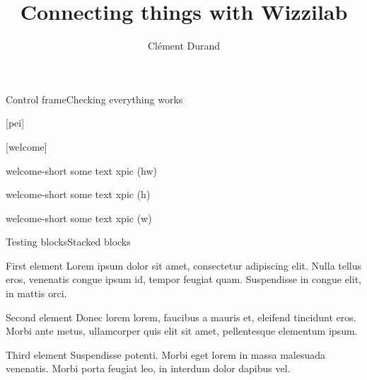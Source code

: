 \documentclass[aspectratio=169]{beamer}
\title[Stage de seconde année à l'École polytechnique]
      {Connecting things with Wizzilab}
\author{Clément Durand}
\begin{document}
\maketitle



\begin{frame}{Control frame}{Checking everything works}
  \lipsum[1]
\end{frame}

[pei]

[welcome]

\begin{xpic}{welcome-short}
  some text xpic (hw)
\end{xpic}



\begin{xpic}[h]{welcome-short}
  some text xpic (h)
\end{xpic}



\begin{xpic}[w]{welcome-short}
  some text xpic (w)
\end{xpic}



\begin{frame}{Testing blocks}{Stacked blocks}
  \begin{block}{First element}
    Lorem ipsum dolor sit amet, consectetur adipiscing elit. Nulla tellus eros, venenatis congue ipsum id, tempor feugiat quam. Suspendisse in congue elit, in mattis orci.
  \end{block}

  \begin{block}{Second element}
    Donec lorem lorem, faucibus a mauris et, eleifend tincidunt eros. Morbi ante metus, ullamcorper quis elit sit amet, pellentesque elementum ipsum.
  \end{block}

  \begin{block}{Third element}
    Suspendisse potenti. Morbi eget lorem in massa malesuada venenatis. Morbi porta feugiat leo, in interdum dolor dapibus vel.
  \end{block}
\end{frame}
\end{document}
